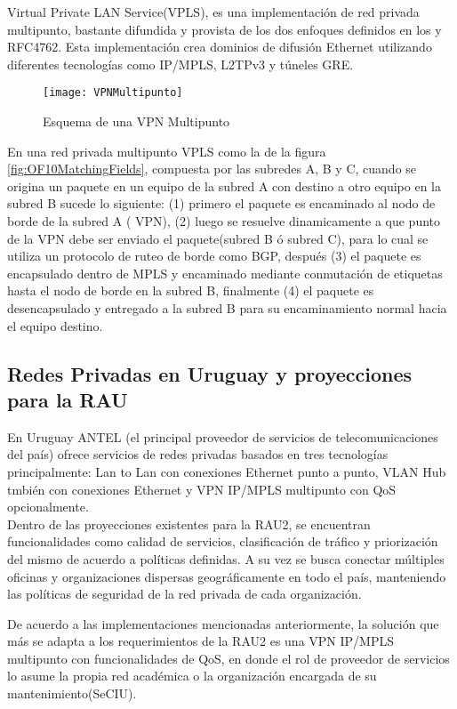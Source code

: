 Virtual Private LAN Service(VPLS), es una implementaci\'on de red privada multipunto, bastante difundida y provista de los dos enfoques definidos en los \citep{kompella2007virtual} y RFC4762\cite{lasserre2007virtual}. Esta implementaci\'on crea dominios de difusión Ethernet utilizando diferentes tecnologías como IP/MPLS, L2TPv3 y túneles GRE.

\begin{figure}[htbp!] 
\centering    
\texttt{[image: VPNMultipunto]}
\caption[Esquema de una VPN Multipunto]{Esquema de una VPN Multipunto}
\label{fig:VPNMulipunto}
\end{figure}
 
En una red privada multipunto VPLS como la de la figura \ref{fig:OF10MatchingFields}, compuesta por las subredes A, B y C, cuando se origina un paquete en un equipo de la subred A con destino a otro equipo en la subred B sucede lo siguiente: (1) primero el paquete es encaminado al nodo de borde de la subred A ( VPN), (2) luego se resuelve dinamicamente a que punto de la VPN debe ser enviado el paquete(subred B \'o subred C), para lo cual se utiliza un protocolo de ruteo de borde como BGP, despu\'es (3) el paquete es encapsulado dentro de MPLS y encaminado mediante conmutaci\'on de etiquetas hasta el nodo de borde en la subred B, finalmente (4) el paquete es desencapsulado y entregado a la subred B para su encaminamiento normal hacia el equipo destino.

\subsection{Redes Privadas en Uruguay y proyecciones para la RAU}
En Uruguay ANTEL (el principal proveedor de servicios de telecomunicaciones del país) ofrece servicios de redes privadas basados en tres tecnolog\'ias principalmente: Lan to Lan con conexiones Ethernet punto a punto, VLAN Hub tmbi\'en con conexiones Ethernet y VPN IP/MPLS multipunto con QoS opcionalmente.\\

Dentro de las proyecciones existentes para la RAU2, se encuentran funcionalidades como calidad de servicios, clasificaci\'on de tr\'afico y priorizaci\'on del mismo de acuerdo a pol\'iticas definidas. A su vez se busca conectar m\'ultiples oficinas y organizaciones dispersas geogr\'aficamente en todo el país, manteniendo las pol\'iticas de seguridad de la red privada de cada organizaci\'on. 

De acuerdo a las implementaciones mencionadas anteriormente, la soluci\'on que m\'as se adapta a los requerimientos de la RAU2 es una VPN IP/MPLS multipunto con funcionalidades de QoS, en donde el rol de proveedor de servicios lo asume la propia red académica o la organizaci\'on encargada de su mantenimiento(SeCIU).\\ 

